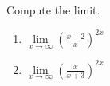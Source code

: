 Compute the limit. 
\begin{enumerate}
\item $\displaystyle\lim\limits_{x\to\infty} \left(\frac{x-2 }{x} \right)^{2 x}$ 

\item $\displaystyle \lim\limits_{x\to\infty} \left(\frac{x}{ x + 3} \right)^{2x}$ 

\end{enumerate}